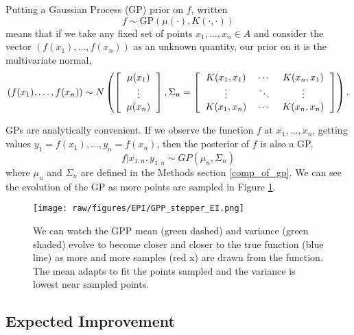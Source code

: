 Putting a Gaussian Process (GP) prior on $f$, written
\begin{equation}
 f \sim \mbox{GP}(\mu(\cdot), K(\cdot, \cdot))
\end{equation}
means that if we take any fixed set of points $x_{1}, \ldots, x_{n} \in A$ and consider the vector $(f(x_{1}), \ldots, f(x_{n}))$ as an unknown quantity, our prior on it is the multivariate normal,
\begin{equation}
    (f(x_{1}), \ldots, f(x_{n})) \sim N\left( \left[ \begin{tabular}{c} $\mu(x_{1})$ \\ $\vdots$ \\ $\mu(x_{n})$ \end{tabular} \right] , \Sigma_{n} = \left[ \begin{tabular}{ccc} $K(x_{1}, x_{1})$ & $\cdots$ & $K(x_{n}, x_{1})$ \\ $\vdots$ & $\ddots$ & $\vdots$ \\ $K(x_{1}, x_{n})$ & $\cdots$ & $K(x_{n},x_{n})$ \end{tabular} \right] \right).
\end{equation}

GPs are analytically convenient. If we observe the function $f$ at $x_{1}, \ldots, x_{n}$, getting values $y_{1} = f(x_{1}), \ldots, y_{n} = f(x_{n})$, then the posterior of $f$ is also a GP,
\begin{equation}
 f|x_{1:n}, y_{1:n} \sim GP(\mu_{n}, \Sigma_{n})
\end{equation}
where $\mu_{n}$ and $\Sigma_{n}$ are defined in the Methods section \ref{comp_of_gp}. We can see the evolution of the GP as more points are sampled in Figure \ref{fig:GPP_evolve}.

\begin{figure}[hpt]
 	\centerline{\texttt{[image: raw/figures/EPI/GPP\_stepper\_EI.png]}}
    \caption[Evolution of a GPP]{We can watch the GPP mean (green dashed) and variance (green shaded) evolve to become closer and closer to the true function (blue line) as more and more samples (red x) are drawn from the function. The mean adapts to fit the points sampled and the variance is lowest near sampled points.}
 	\label{fig:GPP_evolve}
\end{figure}

\subsection{Expected Improvement}

